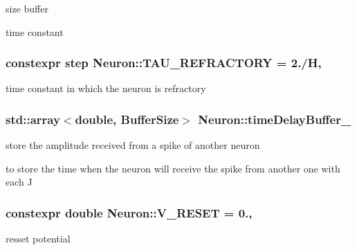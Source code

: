 size buffer 

time constant \hypertarget{classNeuron_add7aa62e8c7b46c13f6fd642c34ed515}{
\subsubsection[{T\-A\-U\-\_\-\-R\-E\-F\-R\-A\-C\-T\-O\-R\-Y}]{\setlength{\rightskip}{0pt plus 5cm}constexpr {\bf step} Neuron\-::\-T\-A\-U\-\_\-\-R\-E\-F\-R\-A\-C\-T\-O\-R\-Y = 2./{\bf H}\hspace{0.3cm}{\ttfamily [static]}, {\ttfamily [private]}}}\label{classNeuron_add7aa62e8c7b46c13f6fd642c34ed515}


time constant in which the neuron is refractory 

\hypertarget{classNeuron_afec65fc094e852787c33c5af93d1997b}{
\subsubsection[{time\-Delay\-Buffer\-\_\-}]{\setlength{\rightskip}{0pt plus 5cm}std\-::array$<$double, {\bf Buffer\-Size}$>$ Neuron\-::time\-Delay\-Buffer\-\_\-\hspace{0.3cm}{\ttfamily [private]}}}\label{classNeuron_afec65fc094e852787c33c5af93d1997b}


store the amplitude received from a spike of another neuron 

to store the time when the neuron will receive the spike from another one with each J \hypertarget{classNeuron_aa794369db2855ccd49d80a4dca09baa9}{
\subsubsection[{V\-\_\-\-R\-E\-S\-E\-T}]{\setlength{\rightskip}{0pt plus 5cm}constexpr double Neuron\-::\-V\-\_\-\-R\-E\-S\-E\-T = 0.\hspace{0.3cm}{\ttfamily [static]}, {\ttfamily [private]}}}\label{classNeuron_aa794369db2855ccd49d80a4dca09baa9}


resset potential 

